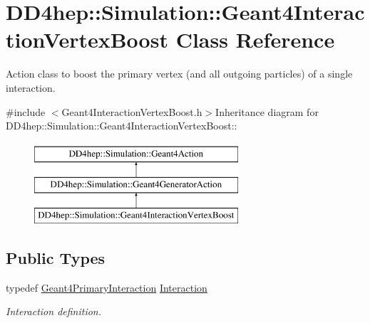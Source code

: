 \hypertarget{class_d_d4hep_1_1_simulation_1_1_geant4_interaction_vertex_boost}{
\section{DD4hep::Simulation::Geant4InteractionVertexBoost Class Reference}
\label{class_d_d4hep_1_1_simulation_1_1_geant4_interaction_vertex_boost}
}


Action class to boost the primary vertex (and all outgoing particles) of a single interaction.  


{\ttfamily \#include $<$Geant4InteractionVertexBoost.h$>$}Inheritance diagram for DD4hep::Simulation::Geant4InteractionVertexBoost::\begin{figure}[H]
\begin{center}
\leavevmode
\includegraphics[height=3cm]{class_d_d4hep_1_1_simulation_1_1_geant4_interaction_vertex_boost}
\end{center}
\end{figure}
\subsection*{Public Types}
\begin{DoxyCompactItemize}
\item 
typedef \hyperlink{class_d_d4hep_1_1_simulation_1_1_geant4_primary_interaction}{Geant4PrimaryInteraction} \hyperlink{class_d_d4hep_1_1_simulation_1_1_geant4_interaction_vertex_boost_a24539ccb7908e132acaf99eeec5111e5}{Interaction}
\begin{DoxyCompactList}\small\item\em Interaction definition. \item\end{DoxyCompactList}\end{DoxyCompactItemize}
